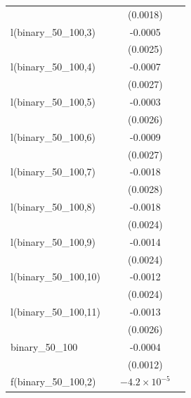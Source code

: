 \begin{tabular}{lccc}
                                    &          & (0.0018)              &   \\   
   l(binary\_50\_100,3)             &          & -0.0005               &   \\   
                                    &          & (0.0025)              &   \\   
   l(binary\_50\_100,4)             &          & -0.0007               &   \\   
                                    &          & (0.0027)              &   \\   
   l(binary\_50\_100,5)             &          & -0.0003               &   \\   
                                    &          & (0.0026)              &   \\   
   l(binary\_50\_100,6)             &          & -0.0009               &   \\   
                                    &          & (0.0027)              &   \\   
   l(binary\_50\_100,7)             &          & -0.0018               &   \\   
                                    &          & (0.0028)              &   \\   
   l(binary\_50\_100,8)             &          & -0.0018               &   \\   
                                    &          & (0.0024)              &   \\   
   l(binary\_50\_100,9)             &          & -0.0014               &   \\   
                                    &          & (0.0024)              &   \\   
   l(binary\_50\_100,10)            &          & -0.0012               &   \\   
                                    &          & (0.0024)              &   \\   
   l(binary\_50\_100,11)            &          & -0.0013               &   \\   
                                    &          & (0.0026)              &   \\   
   binary\_50\_100                  &          & -0.0004               &   \\   
                                    &          & (0.0012)              &   \\   
   f(binary\_50\_100,2)             &          & $-4.2\times 10^{-5}$  &   \\   

\end{tabular}
